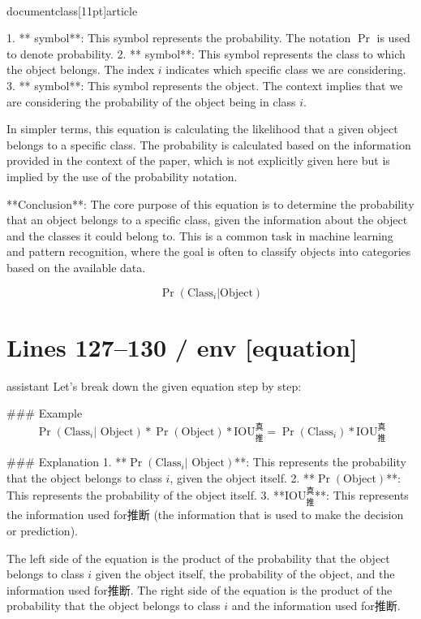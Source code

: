 \\documentclass[11pt]{article}
\begin{document}
1. ** symbol**: This symbol represents the probability. The notation \(\Pr\) is used to denote probability.
2. ** symbol**: This symbol represents the class to which the object belongs. The index \(i\) indicates which specific class we are considering.
3. ** symbol**: This symbol represents the object. The context implies that we are considering the probability of the object being in class \(i\).

In simpler terms, this equation is calculating the likelihood that a given object belongs to a specific class. The probability is calculated based on the information provided in the context of the paper, which is not explicitly given here but is implied by the use of the probability notation.

**Conclusion**: The core purpose of this equation is to determine the probability that an object belongs to a specific class, given the information about the object and the classes it could belong to. This is a common task in machine learning and pattern recognition, where the goal is often to classify objects into categories based on the available data.

\[
\boxed{\Pr(\textrm{Class}_i | \textrm{Object})}
\]


\section*{Lines 127–130 / env [equation]}
assistant
Let's break down the given equation step by step:

### Example
\[
\Pr(\textrm{Class}_i | \textrm{ Object}) * \Pr(\textrm{Object}) * \textrm{IOU}_{\textrm{推}}^{\textrm{真}} = \Pr(\textrm{Class}_i) * \textrm{IOU}_{\textrm{推}}^{\textrm{真}}
\]

### Explanation
1. **\(\Pr(\textrm{Class}_i | \textrm{ Object})\)**: This represents the probability that the object belongs to class \(i\), given the object itself.
2. **\(\Pr(\textrm{Object})\)**: This represents the probability of the object itself.
3. **\(\textrm{IOU}_{\textrm{推}}^{\textrm{真}}\)**: This represents the information used for推断 (the information that is used to make the decision or prediction).

The left side of the equation is the product of the probability that the object belongs to class \(i\) given the object itself, the probability of the object, and the information used for推断. The right side of the equation is the product of the probability that the object belongs to class \(i\) and the information used for推断.
\end{document}
